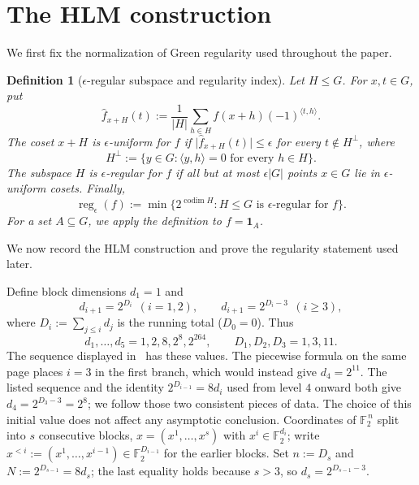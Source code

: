 \documentclass[10pt,a4paper]{amsart}
\newtheorem{definition}[theorem]{Definition}
\numberwithin{theorem}{section}
\newcommand{\F}{\mathbb{F}}
\newcommand{\inner}[2]{\langle #1,#2\rangle}
\newcommand{\abs}[1]{\lvert #1\rvert}
\newcommand{\reg}{\operatorname{reg}}
\newcommand{\codim}{\operatorname{codim}}
\begin{document}
\section{The HLM construction}\label{sec:hlm}

We first fix the normalization of Green regularity used throughout the
paper.

\begin{definition}[$\epsilon$-regular subspace and regularity index]\label{def:reg}
Let $H\le G$.  For $x,t\in G$, put
\[
  \widehat f_{x+H}(t):=\frac1{\abs H}
  \sum_{h\in H}f(x+h)(-1)^{\inner{t}{h}}.
\]
The coset $x+H$ is \emph{$\epsilon$-uniform} for $f$ if
$\abs{\widehat f_{x+H}(t)}\le\epsilon$ for every $t\notin H^\perp$, where
\[
  H^\perp:=\{y\in G:\inner{y}{h}=0\text{ for every }h\in H\}.
\]
The subspace $H$ is \emph{$\epsilon$-regular} for $f$ if all but at most
$\epsilon\abs G$ points $x\in G$ lie in $\epsilon$-uniform cosets.  Finally,
\[
  \reg_\epsilon(f):=
  \min\{2^{\codim H}:H\le G\text{ is $\epsilon$-regular for }f\}.
\]
For a set $A\subseteq G$, we apply the definition to $f=\mathbf 1_A$.
\end{definition}

We now record the HLM construction and prove the regularity statement used
later.

Define block dimensions $d_1=1$ and
\[
  d_{i+1}=2^{D_i}\ \ (i=1,2),\qquad d_{i+1}=2^{D_i-3}\ \ (i\ge3),
\]
where $D_i:=\sum_{j\le i}d_j$ is the running total ($D_0=0$).  Thus
\[
  d_1,\dots,d_5=1,2,8,2^8,2^{264},
  \qquad D_1,D_2,D_3=1,3,11.
\]
The sequence displayed in~\cite[\S2.1]{HLM} has these values.  The
piecewise formula on the same page places $i=3$ in the first branch, which
would instead give $d_4=2^{11}$.  The listed sequence and the identity
$2^{D_{i-1}}=8d_i$ used from level $4$ onward both give
$d_4=2^{D_3-3}=2^8$; we follow those two consistent pieces of data.  The
choice of this initial value does not affect any asymptotic conclusion.
Coordinates of $\F_2^{\,n}$ split into $s$ consecutive blocks,
$x=(x^1,\dots,x^s)$ with $x^i\in\F_2^{d_i}$; write
$x^{<i}:=(x^1,\dots,x^{i-1})\in\F_2^{D_{i-1}}$ for the earlier blocks. Set
$n:=D_s$ and $N:=2^{D_{s-1}}=8d_s$; the last equality holds because $s>3$, so
$d_s=2^{D_{s-1}-3}$.
\end{document}
